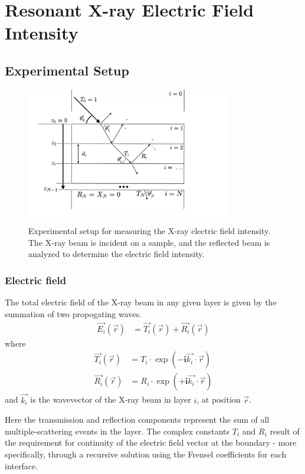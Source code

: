 \documentclass[../main.tex]{subfiles}
\begin{document}
	\chapter{Resonant X-ray Electric Field Intensity}\label{chap:07-res-XEFI}
	\section{Experimental Setup}

	\begin{figure}[H]
		\centering
		\includegraphics[width=0.8\textwidth]{resources/ch7/geometry.png}
		\caption{Experimental setup for measuring the X-ray electric field intensity. The X-ray beam is incident on a sample, and the reflected beam is analyzed to determine the electric field intensity.}
		\label{fig:experimental-setup}
	\end{figure}

	\subsection{Electric field}
	The total electric field of the X-ray beam in any given layer is given by the summation of two propogating waves.
	\begin{align}
		\vec{E_i}(\vec{r}) &= \vec{T_i}(\vec{r}) + \vec{R_i}(\vec{r})
	\end{align}
	where 
	\begin{align}
		\vec{T_i}(\vec{r}) &= T_i \cdot \exp\left(-\mathbf{i} \vec{k_{i}} \cdot \vec{r}\right) \\
		\vec{R_i}(\vec{r}) &= R_i \cdot \exp\left(+\mathbf{i} \vec{k_{i}} \cdot \vec{r}\right)
	\end{align}
	and $\vec{k_i}$ is the wavevector of the X-ray beam in layer $i$, at position $\vec{r}$.
	
	Here the transmission and reflection components represent the sum of all multiple-scattering events in the layer.
	The complex constants $T_i$ and $R_i$ result of the requirement for continuity of the electric field vector at the boundary - more specifically, through a recursive solution using the Frensel coefficients for each interface.
\end{document}
